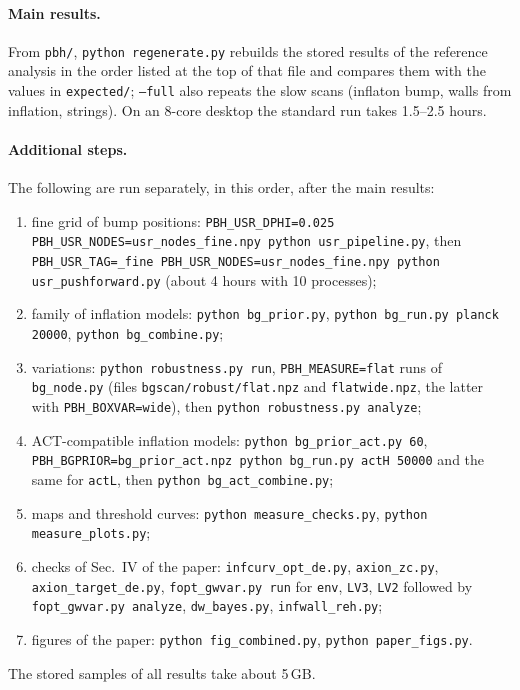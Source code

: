 \documentclass[aps,prd,onecolumn,superscriptaddress,nofootinbib,floatfix]{revtex4-2}
\newcommand{\code}[1]{\texttt{#1}}
\begin{document}
\paragraph*{Main results.}
From \code{pbh/}, \code{python regenerate.py} rebuilds the stored results of the reference analysis in the order listed at the top of that file and compares them with the values in \code{expected/}; \code{--full} also repeats the slow scans (inflaton bump, walls from inflation, strings). On an 8-core desktop the standard run takes 1.5--2.5 hours.

\paragraph*{Additional steps.}
The following are run separately, in this order, after the main results:
\begin{enumerate}
\item fine grid of bump positions: \code{PBH\_USR\_DPHI=0.025 PBH\_USR\_NODES=usr\_nodes\_fine.npy python usr\_pipeline.py}, then \code{PBH\_USR\_TAG=\_fine PBH\_USR\_NODES=usr\_nodes\_fine.npy python usr\_pushforward.py} (about 4 hours with 10 processes);
\item family of inflation models: \code{python bg\_prior.py}, \code{python bg\_run.py planck 20000}, \code{python bg\_combine.py};
\item variations: \code{python robustness.py run}, \code{PBH\_MEASURE=flat} runs of \code{bg\_node.py} (files \code{bgscan/robust/flat.npz} and \code{flatwide.npz}, the latter with \code{PBH\_BOXVAR=wide}), then \code{python robustness.py analyze};
\item ACT-compatible inflation models: \code{python bg\_prior\_act.py 60}, \code{PBH\_BGPRIOR=bg\_prior\_act.npz python bg\_run.py actH 50000} and the same for \code{actL}, then \code{python bg\_act\_combine.py};
\item maps and threshold curves: \code{python measure\_checks.py}, \code{python measure\_plots.py};
\item checks of Sec.~IV of the paper: \code{infcurv\_opt\_de.py}, \code{axion\_zc.py}, \code{axion\_target\_de.py}, \code{fopt\_gwvar.py run} for \code{env}, \code{LV3}, \code{LV2} followed by \code{fopt\_gwvar.py analyze}, \code{dw\_bayes.py}, \code{infwall\_reh.py};
\item figures of the paper: \code{python fig\_combined.py}, \code{python paper\_figs.py}.
\end{enumerate}
The stored samples of all results take about 5\,GB.


\end{document}
